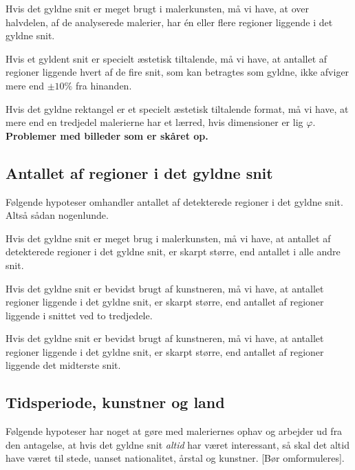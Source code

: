 {\begin{hypotese}
    Hvis det gyldne snit er meget brugt i malerkunsten, må vi have, at
    over halvdelen, af de analyserede malerier, har én eller flere
    regioner liggende i det gyldne snit.
\end{hypotese}

\begin{hypotese}
    Hvis et gyldent snit er specielt æstetisk tiltalende, må vi have, at
    antallet af regioner liggende hvert af de fire snit, som kan
    betragtes som gyldne, ikke afviger mere end $\pm10\%$ fra hinanden.
\end{hypotese}

\begin{hypotese}
    Hvis det gyldne rektangel er et specielt æstetisk tiltalende format,
    må vi have, at mere end en tredjedel malerierne har et lærred, hvis
    dimensioner er lig $\varphi$. \textbf{Problemer med billeder som er
    skåret op.}
\end{hypotese}

\subsection{Antallet af regioner i det gyldne snit}
Følgende hypoteser omhandler antallet af detekterede regioner i det
gyldne snit. Altså sådan nogenlunde.

\begin{hypotese}
    Hvis det gyldne snit er meget brug i malerkunsten, må vi have, at
    antallet af detekterede regioner i det gyldne snit, er skarpt
    større, end antallet i alle andre snit.
\end{hypotese}

\begin{hypotese}
    Hvis det gyldne snit er bevidst brugt af kunstneren, må vi have, at
    antallet regioner liggende i det gyldne snit, er skarpt større, end
    antallet af regioner liggende i snittet ved to tredjedele.
\end{hypotese}

\begin{hypotese}
    Hvis det gyldne snit er bevidst brugt af kunstneren, må vi have, at
    antallet regioner liggende i det gyldne snit, er skarpt større, end
    antallet af regioner liggende det midterste snit.
\end{hypotese}

\subsection{Tidsperiode, kunstner og land}
Følgende hypoteser har noget at gøre med maleriernes ophav og arbejder
ud fra den antagelse, at hvis det gyldne snit \emph{altid} har været
interessant, så skal det altid have været til stede, uanset
nationalitet, årstal og kunstner. [Bør omformuleres].

}
